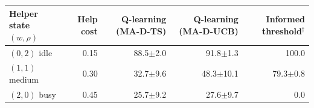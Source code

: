 \begin{tabular}{lrrrr}
\toprule
Helper state $(w,\rho)$ & Help cost & Q-learning (MA-D-TS) & Q-learning (MA-D-UCB) & Informed threshold$^{\dagger}$ \\
\midrule
$(0,2)$ idle & 0.15 & 88.5{\scriptsize$\pm$2.0} & 91.8{\scriptsize$\pm$1.3} & 100.0 \\
$(1,1)$ medium & 0.30 & 32.7{\scriptsize$\pm$9.6} & 48.3{\scriptsize$\pm$10.1} & 79.3{\scriptsize$\pm$0.8} \\
$(2,0)$ busy & 0.45 & 25.7{\scriptsize$\pm$9.2} & 27.6{\scriptsize$\pm$9.7} & 0.0 \\
\bottomrule
\end{tabular}
